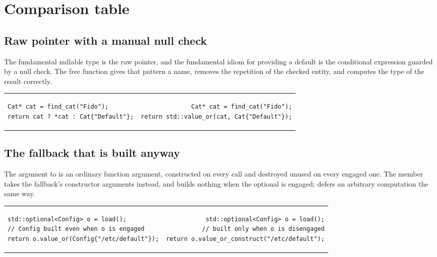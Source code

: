 \documentclass[a4paper,10pt,oneside,openany,final,article]{memoir}
\begin{document}
\chapter{Comparison table}

\section{Raw pointer with a manual null check}

The fundamental nullable type is the raw pointer, and the fundamental idiom
for providing a default is the conditional expression guarded by a null
check. The free function gives that pattern a name, removes the repetition of
the checked entity, and computes the type of the result correctly.

\begin{tabular}{ lr }
  \begin{minipage}[t]{0.45\columnwidth}
    \begin{verbatim}
Cat* cat = find_cat("Fido");
return cat ? *cat : Cat{"Default"};
    \end{verbatim}
  \end{minipage}
  &
    \begin{minipage}[t]{0.45\columnwidth}
      \begin{verbatim}
Cat* cat = find_cat("Fido");
return std::value_or(cat, Cat{"Default"});
      \end{verbatim}
    \end{minipage}
\end{tabular}

\section{The fallback that is built anyway}

The argument to  is an ordinary function argument,
constructed on every call and destroyed unused on every engaged one. The
member  takes the fallback's constructor
arguments instead, and builds nothing when the optional is engaged;
 defers an arbitrary computation the same way.

\begin{tabular}{ lr }
  \begin{minipage}[t]{0.45\columnwidth}
    \begin{verbatim}
std::optional<Config> o = load();
// Config built even when o is engaged
return o.value_or(Config{"/etc/default"});
    \end{verbatim}
  \end{minipage}
  &
    \begin{minipage}[t]{0.45\columnwidth}
      \begin{verbatim}
std::optional<Config> o = load();
// built only when o is disengaged
return o.value_or_construct("/etc/default");
      \end{verbatim}
    \end{minipage}
\end{tabular}
\end{document}
